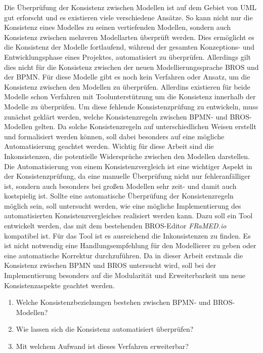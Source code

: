 Die Überprüfung der Konsistenz zwischen Modellen ist auf dem Gebiet von UML gut erforscht und es existieren viele verschiedene Ansätze.
So kann nicht nur die Konsistenz eines Modelles zu seinen vertiefenden Modellen, sondern auch Konsistenz zwischen mehreren Modellarten überprüft werden.
Dies ermöglicht es die Konsistenz der Modelle fortlaufend, während der gesamten Konzeptions- und Entwicklungsphase eines Projektes, automatisiert zu überprüfen. 
Allerdings gilt dies nicht für die Konsistenz zwischen der neuen Modellierungssprache BROS und der BPMN.
Für diese Modelle gibt es noch kein Verfahren oder Ansatz, um die Konsistenz zwischen den Modellen zu überprüfen.
Allerdins existieren für beide Modelle schon Verfahren mit Toolunterstützung um die Konsistenz innerhalb der Modelle zu überprüfen.
Um diese fehlende Konsistenzprüfung zu entwickeln, muss zunächst geklärt werden, welche Konsistenzregeln zwischen BPMN- und BROS-Modellen gelten.
Da solche Konsistenzregeln auf unterschiedlichen Weisen erstellt und formalisiert werden können, soll dabei besonders auf eine mögliche Automatisierung geachtet werden.
Wichtig für diese Arbeit sind die Inkonsistenzen, die potentielle Widersprüche zwischen den Modellen darstellen. 
Die Automatisierung von einem Konsistenzvergleich ist eine wichtiger Aspekt in der Konsistenzprüfung, da eine manuelle Überprüfung nicht nur fehleranfälliger ist, sondern auch besonders bei großen Modellen sehr zeit- und damit auch kostspielig ist.
Sollte eine automatische Überprüfung der Konsistenzregeln möglich sein, soll untersucht werden, wie eine mögliche Implementierung des automatisierten Konsistenzvergleiches realisiert werden kann.
Dazu soll ein Tool entwickelt werden, das mit dem bestehenden BROS-Editor \emph{FRaMED.io} kompatibel ist.
Für das Tool ist es ausreichend die Inkonsistenzen zu finden.
Es ist nicht notwendig eine Handlungsempfehlung für den Modellierer zu geben oder eine automatische Korrektur durchzuführen. 
Da in dieser Arbeit erstmals die Konsistenz zwischen BPMN und BROS untersucht wird, soll bei der Implementierung besonders auf die Modularität und Erweiterbarkeit um neue Konsistenzaspekte geachtet werden.

\begin{enumerate}
    \item Welche Konsistenzbeziehungen bestehen zwischen BPMN- und BROS-Modellen?
    \item Wie lassen sich die Konsistenz automatisiert überprüfen?
    \item Mit welchem Aufwand ist dieses Verfahren erweiterbar?
\end{enumerate}

